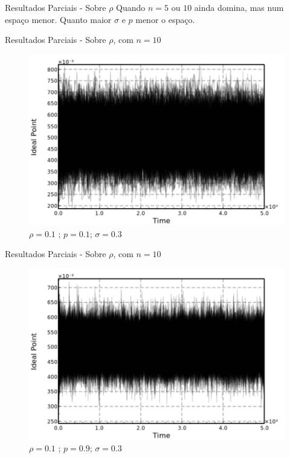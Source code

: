 \documentclass{beamer}
\begin{document}
\begin{frame}{Resultados Parciais - Sobre \(\rho\)}
Quando \(n = 5 \text{ ou } 10\) ainda domina, mas num espaço menor.
Quanto maior  \(\sigma\) e \(p\) menor o espaço.  

\end{frame}


\begin{frame}{Resultados Parciais - Sobre \(\rho\), com \(n = 10 \)}
  
  \begin{figure}[H]
    \centering
    \includegraphics[scale = 0.5]{ims/p01sigma03rho01.pdf}
    \caption{\(\rho = 0.1\)  ; \(p = 0.1\); \(\sigma = 0.3\) }
  \end{figure}
\end{frame}


\begin{frame}{Resultados Parciais - Sobre \(\rho\), com \(n = 10 \)}
  
  \begin{figure}[H]
    \centering
    \includegraphics[scale = 0.5]{ims/p09sigma03rho01.pdf}
    \caption{\(\rho = 0.1\)  ; \(p = 0.9\); \(\sigma = 0.3\) }
  \end{figure}
\end{frame}
\end{document}
